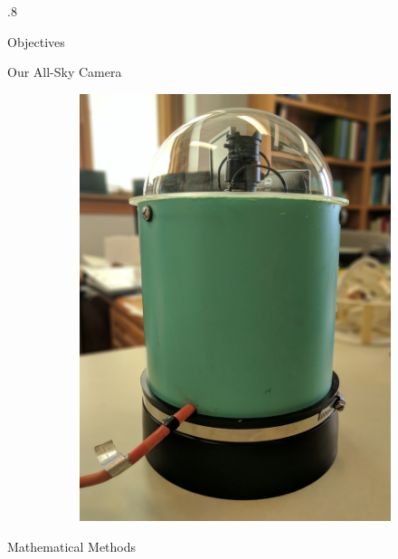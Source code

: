 \documentclass[final]{beamer}
\newlength{\twocolwid}
\begin{document}
\begin{frame}[t]
\begin{columns}[t]
\begin{column}{.8\twocolwid}
\begin{alertblock}{Objectives}
\end{alertblock}


\begin{alertblock}{Our All-Sky Camera}

\begin{figure}
\centering
\begin{subfigure}{.7\textwidth}
  \centering
  \includegraphics[width=\linewidth]{deesix.jpg}
  \label{fig:d6}
\end{subfigure}%
\end{figure}

\end{alertblock}
\begin{block}{Mathematical Methods}


\end{block}
\end{column}
\end{columns}
\end{frame}
\end{document}
